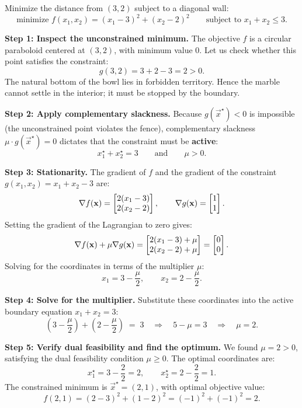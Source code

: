\begin{example}
\label{ch36:ex-qp2d}
Minimize the distance from $(3, 2)$ subject to a diagonal wall:
\[
  \text{minimize } f(x_1, x_2) = (x_1 - 3)^2 + (x_2 - 2)^2 \qquad \text{subject to } x_1 + x_2 \le 3.
\]

\textbf{Step 1: Inspect the unconstrained minimum.}
The objective $f$ is a circular paraboloid centered at $(3, 2)$, with minimum value $0$. Let us check whether this point satisfies the constraint:
\[
  g(3, 2) = 3 + 2 - 3 = 2 > 0.
\]
The natural bottom of the bowl lies in forbidden territory. Hence the marble cannot settle in the interior; it must be stopped by the boundary.

\textbf{Step 2: Apply complementary slackness.}
Because $g(\vec{x}^\star) < 0$ is impossible (the unconstrained point violates the fence), complementary slackness $\mu \cdot g(\vec{x}^\star) = 0$ dictates that the constraint must be \textbf{active}:
\[
  x_1^\star + x_2^\star = 3 \qquad \text{and} \qquad \mu > 0.
\]

\textbf{Step 3: Stationarity.}
The gradient of $f$ and the gradient of the constraint $g(x_1, x_2) = x_1 + x_2 - 3$ are:
\[
  \nabla f(\mathbf{x}) = \begin{bmatrix}2(x_1 - 3) \\ 2(x_2 - 2)\end{bmatrix}, \qquad \nabla g(\mathbf{x}) = \begin{bmatrix}1 \\ 1\end{bmatrix}.
\]
Setting the gradient of the Lagrangian to zero gives:
\[
  \nabla f(\mathbf{x}) + \mu \nabla g(\mathbf{x}) = \begin{bmatrix}2(x_1 - 3) + \mu \\ 2(x_2 - 2) + \mu\end{bmatrix} = \begin{bmatrix}0 \\ 0\end{bmatrix}.
\]
Solving for the coordinates in terms of the multiplier $\mu$:
\[
  x_1 = 3 - \frac{\mu}{2}, \qquad x_2 = 2 - \frac{\mu}{2}.
\]

\textbf{Step 4: Solve for the multiplier.}
Substitute these coordinates into the active boundary equation $x_1 + x_2 = 3$:
\[
  \left(3 - \frac{\mu}{2}\right) + \left(2 - \frac{\mu}{2}\right) \;=\; 3
  \quad\Longrightarrow\quad 5 - \mu = 3
  \quad\Longrightarrow\quad \mu = 2.
\]

\textbf{Step 5: Verify dual feasibility and find the optimum.}
We found $\mu = 2 > 0$, satisfying the dual feasibility condition $\mu \ge 0$.
The optimal coordinates are:
\[
  x_1^\star = 3 - \frac{2}{2} = 2, \qquad x_2^\star = 2 - \frac{2}{2} = 1.
\]
The constrained minimum is $\vec{x}^\star = (2, 1)$, with optimal objective value:
\[
  f(2, 1) = (2 - 3)^2 + (1 - 2)^2 = (-1)^2 + (-1)^2 = 2.
\]


\end{example}
